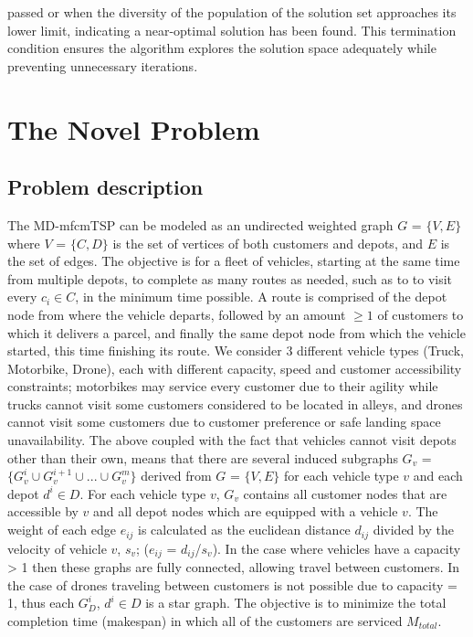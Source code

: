 \documentclass{article}
\begin{document}
passed or when the diversity of the population of the solution set approaches its lower limit, indicating a near-optimal solution has been found. This termination condition ensures the algorithm explores the solution space adequately while preventing unnecessary iterations. 
	\par 
	\section{The Novel Problem}
	\subsection{Problem description}
	The MD-mfcmTSP can be modeled as an undirected weighted graph $G$ = $\{V,E\}$ where $V$ = $\{C,D\}$ is the set of vertices of both customers and depots, and $E$ is the set of edges. The objective is for a fleet of vehicles, starting at the same time from multiple depots, to complete as many routes as needed, such as to to visit every $c_i\in C$, in the minimum time possible. A route is comprised of the depot node from where the vehicle departs, followed by an amount $\geq 1$ of customers to which it delivers a parcel, and finally the same depot node from which the vehicle started, this time finishing its route. We consider 3 different vehicle types (Truck, Motorbike, Drone), each with different capacity, speed and customer accessibility constraints; motorbikes may service every customer due to their agility while trucks cannot visit some customers considered to be located in alleys, and drones cannot visit some customers due to customer preference or safe landing space unavailability. The above coupled with the fact that vehicles cannot visit depots other than their own, means that there are several induced subgraphs  $G_v$ = $\{G_v^i\cup G_v^{i+1}\cup ...\cup G_v^{m}\}$ derived from $G$ = $\{V,E\}$ for each vehicle type $v$ and each depot $d^i\in D$. For each vehicle type $v$, $G_v$ contains all customer nodes that are accessible by $v$ and all depot nodes which are equipped with a vehicle $v$. The weight of each edge $e_{ij}$ is calculated as the euclidean distance $d_{ij}$ divided by the velocity of vehicle $v$, $s_v$; ($e_{ij}$ = $d_{ij}$/$s_v$). In the case where vehicles have a  capacity > 1 then these graphs are fully connected, allowing travel between customers. In the case of drones traveling between customers is not possible due to capacity = 1, thus each $G_D^i$, $d^i\in D$ is a star graph. The objective is to minimize the total completion time (makespan) in which all of the customers are serviced $M_{total}$.
	\par
\end{document}
